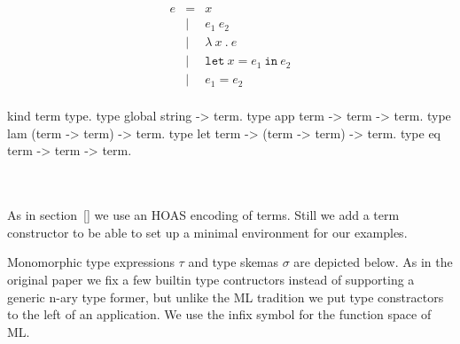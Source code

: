 \documentclass[a4paper, 11pt]{book}
\begin{document}
\begin{center}
\begin{minipage}{0.35\textwidth}
$$
\begin{array}{lrl}
  e & =     & x                                 \\
  & \vert & e_1\ e_2                            \\
  & \vert & \lambda\ x\ .\ e                    \\
  & \vert & \mathtt{let}\ x = e_1\ \mathtt{in}\ e_2 \\
  & \vert & e_1 = e_2 \\
\end{array}
$$
\end{minipage}
\begin{minipage}{0.55\textwidth}
\vspace{0.5em}
\begin{elpicodelj}
kind term type.
type global  string -> term.
type app term -> term -> term.
type lam (term -> term) -> term.
type let term -> (term -> term) -> term.
type eq  term -> term -> term.
\end{elpicodelj}
\end{minipage}
\end{center}
~\\  
~\\  
As in section~\ref{} we use an HOAS encoding of terms.
Still we add a  term constructor to
be able to set up a minimal environment for our examples.

Monomorphic type expressions $\tau$ and type skemas $\sigma$
are depicted below. As in the original paper we fix a few builtin type contructors
instead of supporting a generic n-ary type former, but unlike
the ML tradition we put type constractors to the left of an application.
We use the infix symbol \elpiinline{-->} for the function space of ML.
\end{document}
